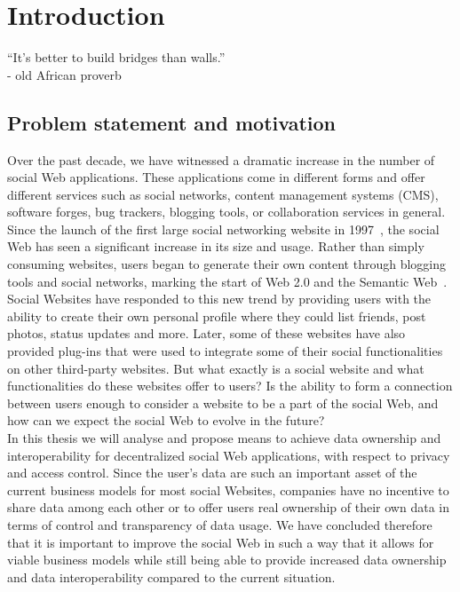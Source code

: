 \chapter{Introduction}
\label{ch:intro}
\setcounter{page}{1}

``It's better to build bridges than walls.''\\
- old African proverb

\section{Problem statement and motivation}
\label{sec:statement}
Over the past decade, we have witnessed a dramatic increase in the number of social Web applications. These applications come in different forms and offer different services such as social networks, content management systems (CMS), software forges, bug trackers, blogging tools, or collaboration services in general.\\

Since the launch of the first large social networking website in 1997~\cite{ellison2007social}, the social Web has seen a significant increase in its size and usage. Rather than simply consuming websites, users began to generate their own content through blogging tools and social networks, marking the start of Web 2.0 and the Semantic Web~\cite{berners1999weaving}. Social Websites have responded to this new trend by providing users with the ability to create their own personal profile where they could list friends, post photos, status updates and more. Later, some of these websites have also provided plug-ins that were used to integrate some of their social functionalities on other third-party websites. But what exactly is a social website and what functionalities do these websites offer to users? Is the ability to form a connection between users enough to consider a website to be a part of the social Web, and how can we expect the social Web to evolve in the future?\\

In this thesis we will analyse and propose means to achieve data ownership and interoperability for decentralized social Web applications, with respect to privacy and access control. Since the user's data are such an important asset of the current business models for most social Websites, companies have no incentive to share data among each other or to offer users real ownership of their own data in terms of control and transparency of data usage. We have concluded therefore that it is important to improve the social Web in such a way that it allows for viable business models while still being able to provide increased data ownership and data interoperability compared to the current situation.\\

